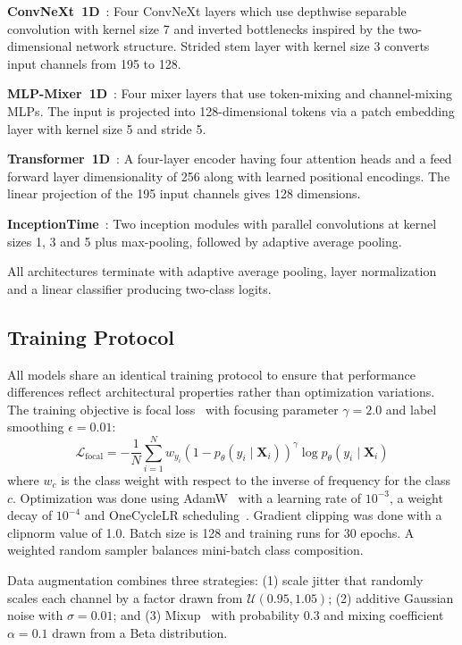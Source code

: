\documentclass[letterpaper,journal]{IEEEtran}
\begin{document}
\textbf{ConvNeXt~1D}~\cite{liu2022convnext}: Four ConvNeXt layers which use depthwise separable convolution with kernel size 7 and inverted bottlenecks inspired by the two-dimensional network structure. Strided stem layer with kernel size 3 converts input channels from 195 to 128.

\textbf{MLP-Mixer~1D}~\cite{tolstikhin2021mlpmixer}: Four mixer layers that use token-mixing and channel-mixing MLPs. The input is projected into 128-dimensional tokens via a patch embedding layer with kernel size 5 and stride 5.

\textbf{Transformer~1D}~\cite{vaswani2017attention}: A four-layer encoder having four attention heads and a feed forward layer dimensionality of 256 along with learned positional encodings. The linear projection of the 195 input channels gives 128 dimensions.

\textbf{InceptionTime}~\cite{fawaz2020inceptiontime}: Two inception modules with parallel convolutions at kernel sizes 1, 3 and 5 plus max-pooling, followed by adaptive average pooling.

All architectures terminate with adaptive average pooling, layer normalization and a linear classifier producing two-class logits.

\subsection{Training Protocol}

All models share an identical training protocol to ensure that performance differences reflect architectural properties rather than optimization variations. The training objective is focal loss~\cite{lin2017focal} with focusing parameter $\gamma = 2.0$ and label smoothing $\epsilon = 0.01$:
\begin{equation}
    \mathcal{L}_{\text{focal}} = -\frac{1}{N} \sum_{i=1}^{N} w_{y_i} (1 - p_\theta(y_i \mid \mathbf{X}_i))^\gamma \log p_\theta(y_i \mid \mathbf{X}_i)
\end{equation}
where $w_c$ is the class weight with respect to the inverse of frequency for the class $c$. Optimization was done using AdamW~\cite{loshchilov2019adamw} with a learning rate of $10^{-3}$, a weight decay of $10^{-4}$ and OneCycleLR scheduling~\cite{smith2019onecycle}. Gradient clipping was done with a clipnorm value of 1.0. Batch size is 128 and training runs for 30 epochs. A weighted random sampler balances mini-batch class composition.

Data augmentation combines three strategies: (1) scale jitter that randomly scales each channel by a factor drawn from $\mathcal{U}(0.95, 1.05)$; (2) additive Gaussian noise with $\sigma = 0.01$; and (3) Mixup~\cite{zhang2018mixup} with probability 0.3 and mixing coefficient $\alpha = 0.1$ drawn from a Beta distribution.
\end{document}
